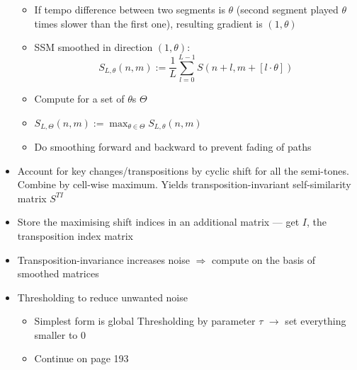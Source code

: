 \documentclass[fleqn,12pt]{scrartcl}
\begin{document}
\begin{itemize}
\begin{itemize}
			\item
				If tempo difference between two segments is $\theta$ (second segment played $\theta$ times slower than the first one), resulting gradient is $(1,\theta)$
			\item
				SSM smoothed in direction $(1,\theta)$:
				$$S_{L,\theta}(n,m) := \frac1L \sum_{l = 0}^{L-1} S(n+l,m+[l\cdot \theta])$$
			\item
				Compute for a set of $\theta$s $\Theta$
			\item
				$S_{L,\Theta}(n,m) := \max_{\theta \in \Theta} S_{L,\theta}(n,m)$
			\item
				Do smoothing forward and backward to prevent fading of paths
		\end{itemize}
	\item
		Account for key changes/transpositions by cyclic shift for all the semi-tones. Combine by cell-wise maximum. Yields transposition-invariant self-similarity matrix $S^{TI}$
	\item
		Store the maximising shift indices in an additional matrix --- get $I$, the transposition index matrix
	\item
		Transposition-invariance increases noise $\Rightarrow$ compute on the basis of smoothed matrices
	\item
		Thresholding to reduce unwanted noise
		\begin{itemize}
			\item
				Simplest form is global Thresholding by parameter $\tau$ $\rightarrow$ set everything smaller to 0
			\item Continue on page 193
		\end{itemize}
\end{itemize}
\end{document}
